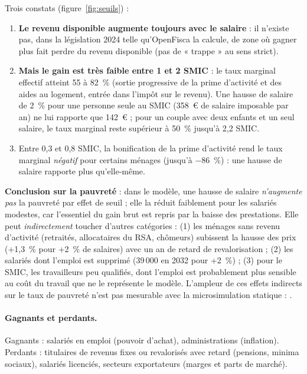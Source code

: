 Trois constats (figure~\ref{fig:seuils}) :
\begin{enumerate}
\item \textbf{Le revenu disponible augmente toujours avec le salaire} : il n'existe pas, dans la législation 2024 telle
qu'OpenFisca la calcule, de zone où gagner plus fait perdre du revenu disponible (pas de « trappe » au sens strict).
\item \textbf{Mais le gain est très faible entre 1 et 2 SMIC} : le taux marginal effectif atteint 55 à 82~\% (sortie
progressive de la prime d'activité et des aides au logement, entrée dans l'impôt sur le revenu). Une hausse de salaire
de 2~\% pour une personne seule au SMIC (358~€ de salaire imposable par an) ne lui rapporte que 142~€ ; pour un couple avec deux
enfants et un seul salaire, le taux marginal reste supérieur à 50~\% jusqu'à 2,2 SMIC.
\item Entre 0,3 et 0,8 SMIC, la bonification de la prime d'activité rend le taux marginal \emph{négatif} pour certains
ménages (jusqu'à $-$86~\%) : une hausse de salaire rapporte plus qu'elle-même.
\end{enumerate}

\textbf{Conclusion sur la pauvreté} : dans le modèle, une hausse de salaire \emph{n'augmente pas} la pauvreté par effet
de seuil ; elle la réduit faiblement pour les salariés modestes, car l'essentiel du gain brut est repris par la baisse
des prestations. Elle peut \emph{indirectement} toucher d'autres catégories : (1) les ménages sans revenu d'activité
(retraités, allocataires du RSA, chômeurs) subissent la hausse des prix (+1,3~\% pour +2~\% de salaires) avec un an de
retard de revalorisation ; (2) les salariés dont l'emploi est supprimé (39\,000 en 2032 pour +2~\%) ; (3) pour le SMIC,
les travailleurs peu qualifiés, dont l'emploi est probablement plus sensible au coût du travail que ne le représente
le modèle. L'ampleur de ces effets indirects sur le taux de pauvreté n'est pas mesurable avec la microsimulation
statique : .

\paragraph{Gagnants et perdants.} Gagnants : salariés en emploi (pouvoir d'achat), administrations (inflation).
Perdants : titulaires de revenus fixes ou revalorisés avec retard (pensions, minima sociaux), salariés licenciés,
secteurs exportateurs (marges et parts de marché).

